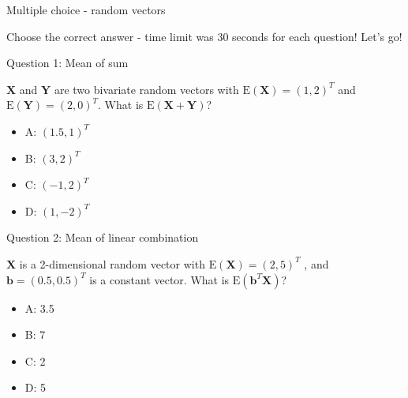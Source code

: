 \documentclass[ignorenonframetext,]{beamer}
\providecommand{\tightlist}{%
  \setlength{\itemsep}{0pt}\setlength{\parskip}{0pt}}
\begin{document}
\begin{frame}

\begin{block}{Multiple choice - random vectors}

\vspace{2mm}

Choose the correct answer - time limit was 30 seconds for each question!
Let's go!

\begin{block}{Question 1: Mean of sum}

\vspace{2mm}

\(\mathbf{X}\) and \(\mathbf{Y}\) are two bivariate random vectors with
\(\text{E}(\mathbf{X})=(1,2)^T\) and \(\text{E}(\mathbf{Y})=(2,0)^T\).
What is \(\text{E}(\mathbf{X}+\mathbf{Y})\)?

\begin{itemize}
\tightlist
\item
  A: \((1.5,1)^T\)
\item
  B: \((3,2)^T\)
\item
  C: \((-1,2)^ T\)
\item
  D: \((1,-2)^T\)
\end{itemize}

\end{block}

\end{block}

\end{frame}

\begin{frame}

\begin{block}{Question 2: Mean of linear combination}

\vspace{2mm}

\(\mathbf{X}\) is a 2-dimensional random vector with
\(\text{E}(\mathbf{X})=(2,5)^T\) , and \(\mathbf{b}=(0.5, 0.5)^T\) is a
constant vector. What is \(\text{E}(\mathbf{b}^T\mathbf{X})\)?

\begin{itemize}
\tightlist
\item
  A: 3.5
\item
  B: 7
\item
  C: 2
\item
  D: 5
\end{itemize}

\end{block}

\end{frame}
\end{document}
